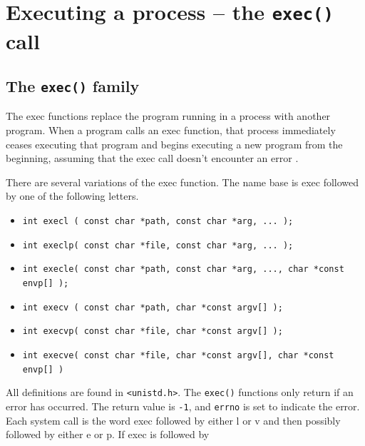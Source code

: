 \documentclass[a4paper]{article}
\begin{document}
\section{Executing a process -- the \texttt{exec()} call}


\subsection{The \texttt{exec()} family}
The exec functions replace the program running in a process with another program.
When a program calls an exec function, that process immediately ceases executing that
program and begins executing a new program from the beginning, assuming that the
exec call doesn't encounter an error \cite{bookmitchell}.

There are several variations of the exec function. The name base is exec followed by one of the following letters.
\begin{itemize}
    \item \texttt{int execl ( const char *path, const char *arg, ... );}
    \item \texttt{int execlp( const char *file, const char *arg, ... );}
    \item \texttt{int execle( const char *path, const char *arg, ..., char *const envp[] );}
    \item \texttt{int execv ( const char *path, char *const argv[] );}
    \item \texttt{int execvp( const char *file, char *const argv[] );}
    \item \texttt{int execve( const char *file, char *const argv[], char *const envp[] )}
\end{itemize}
All definitions are found in \texttt{<unistd.h>}. The \texttt{exec()} functions only return if an error has occurred. The return value is \texttt{-1}, and \texttt{errno} is set to indicate the error. Each system call is the word exec followed by either l or v and then possibly followed by either e or p. If exec is followed by
\end{document}
